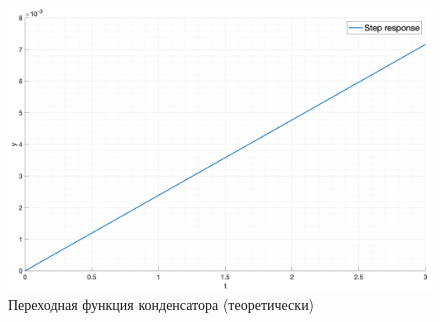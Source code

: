 \begin{figure}[ht!]
    \centering
    \includegraphics[width=\textwidth]{media/plots/task3_step_response_eq.png}
    \caption{Переходная функция конденсатора (теоретически)}
    \label{fig:task3_step_response_eq}
\end{figure}

